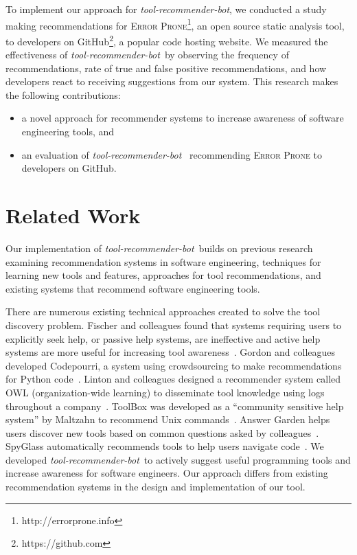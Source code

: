 \documentclass[sigconf,review,anonymous]{acmart}
\newcommand{\tool}{\textsl{tool-recommender-bot}}
\begin{document}

To implement our approach for \tool, we conducted a study making recommendations for \textsc{Error Prone}\footnote{http://errorprone.info}, an open source static analysis tool, to developers on GitHub\footnote{https://github.com}, a popular code hosting website. We measured the effectiveness of \tool~by observing the frequency of recommendations, rate of true and false positive recommendations, and how developers react to receiving suggestions from our system. This research makes the following contributions:

\begin{itemize}
 \item a novel approach for recommender systems to increase awareness of software engineering tools, and
 \item an evaluation of \tool~ recommending \textsc{Error Prone} to developers on GitHub.
 \end{itemize}

\section{Related Work}
Our implementation of \tool~builds on previous research examining recommendation systems in software engineering, techniques for learning new tools and features, approaches for tool recommendations, and existing systems that recommend software engineering tools.

There are numerous existing technical approaches created to solve the tool discovery problem. Fischer and colleagues found that systems requiring users to explicitly seek help, or passive help systems, are ineffective and active help systems are more useful for increasing tool awareness~\cite{Fischer1984ActiveHelpSystems}. Gordon and colleagues developed Codepourri, a system using crowdsourcing to make recommendations for Python code~\cite{Gordon2015Codepourri}. Linton and colleagues designed a recommender system called OWL (organization-wide learning) to disseminate tool knowledge using logs throughout a company~\cite{Linton2000OWL}. ToolBox was developed as a ``community sensitive help system'' by Maltzahn to recommend Unix commands~\cite{Maltzahn1995Toolbox}. Answer Garden helps users discover new tools based on common questions asked by colleagues~\cite{Ackerman1990AnswerGarden}. SpyGlass automatically recommends tools to help users navigate code~\cite{Viriyakattiyaporn2010Spyglass}. We developed \tool~to actively suggest useful programming tools and increase awareness for software engineers. Our approach differs from existing recommendation systems in the design and implementation of our tool.
\end{document}
